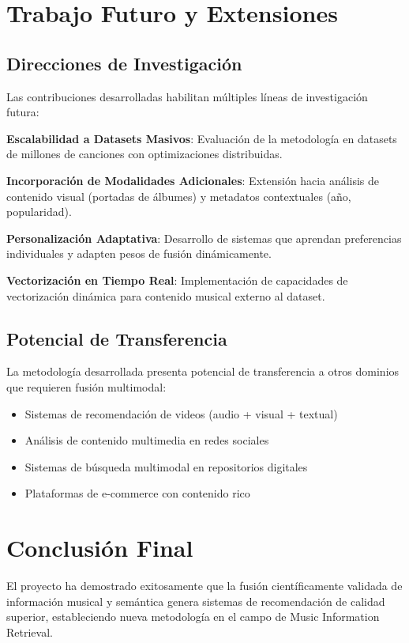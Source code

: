 \documentclass[12pt,a4paper]{report}
\begin{document}
\section{Trabajo Futuro y Extensiones}

\subsection{Direcciones de Investigación}

Las contribuciones desarrolladas habilitan múltiples líneas de investigación futura:

\textbf{Escalabilidad a Datasets Masivos}: Evaluación de la metodología en datasets de millones de canciones con optimizaciones distribuidas.

\textbf{Incorporación de Modalidades Adicionales}: Extensión hacia análisis de contenido visual (portadas de álbumes) y metadatos contextuales (año, popularidad).

\textbf{Personalización Adaptativa}: Desarrollo de sistemas que aprendan preferencias individuales y adapten pesos de fusión dinámicamente.

\textbf{Vectorización en Tiempo Real}: Implementación de capacidades de vectorización dinámica para contenido musical externo al dataset.

\subsection{Potencial de Transferencia}

La metodología desarrollada presenta potencial de transferencia a otros dominios que requieren fusión multimodal:

\begin{itemize}
\item Sistemas de recomendación de videos (audio + visual + textual)
\item Análisis de contenido multimedia en redes sociales
\item Sistemas de búsqueda multimodal en repositorios digitales
\item Plataformas de e-commerce con contenido rico
\end{itemize}

\section{Conclusión Final}

El proyecto ha demostrado exitosamente que la fusión científicamente validada de información musical y semántica genera sistemas de recomendación de calidad superior, estableciendo nueva metodología en el campo de Music Information Retrieval.
\end{document}
